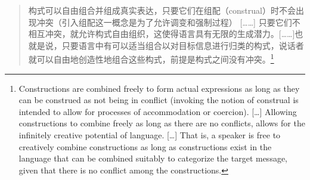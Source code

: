 \begin{quotation}
构式可以自由组合并组成真实表达，只要它们在组配（construal）时不会出现冲突（引入组配这一概念是为了允许调变和强制过程）
[……]
只要它们不相互冲突，就允许构式自由组织，这使得语言具有无限的生成潜力。[……]也就是说，只要语言中有可以适当组合以对目标信息进行归类的构式，说话者就可以自由地创造性地组合这些构式，前提是构式之间没有冲突。\citep[]{Goldberg2006a}\footnote{%
Constructions are combined freely to form actual expressions as long
as they can be construed as not being in conflict (invoking the notion
of construal is intended to allow for processes of accommodation or
coercion). 
[\ldots] 
Allowing constructions to combine freely as long as there are no
conflicts, allows for the infinitely creative potential of language.
[\ldots] That is, a speaker is free to creatively combine constructions as
long as constructions exist in the language that can be combined
suitably to categorize the target message, given that there is no
conflict among the constructions.
} 
\end{quotation}

